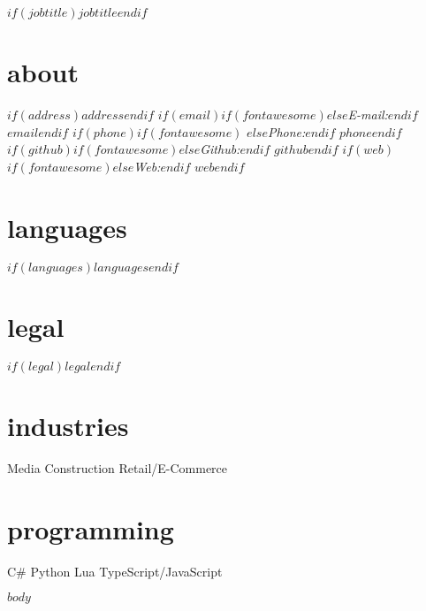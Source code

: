 \documentclass[]{template/friggeri-cv}
\begin{document}
       $if(jobtitle)${$jobtitle$}$endif$

\begin{aside}
  \section{about}
    $if(address)${$address$}$endif$
    $if(email)$$if(fontawesome)$\faEnvelopeO \hspace{1 mm}$else$\emph{E-mail:}$endif$ \href{mailto:}{\tt $email$}$endif$
    $if(phone)$$if(fontawesome)$ \faPhone \hspace{1 mm}$else$\emph{Phone:}$endif$  $phone$$endif$ 
    $if(github)$$if(fontawesome)$\faGithub \hspace{1 mm}$else$\emph{Github:}$endif$ \href{http://github.com/$github$}{\tt $github$}$endif$     $if(web)$$if(fontawesome)$\faGlobe \hspace{1 mm}$else$\emph{Web:}$endif$ \href{http://$web$}{\tt $web$}$endif$
  \section{languages}
    $if(languages)${$languages$}$endif$
  \section{legal}
    $if(legal)${$legal$}$endif$
  \section{industries}
    Media
    Construction
    Retail/E-Commerce
  \section{programming}
    C\#
    Python
    Lua
    TypeScript/JavaScript
\end{aside}

$body$
\end{document}
